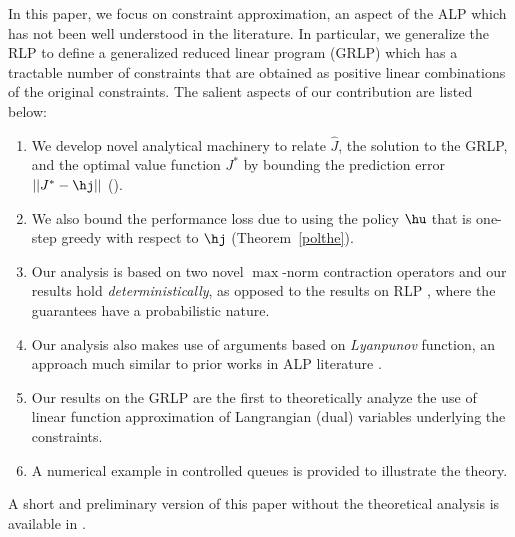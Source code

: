 In this paper, we focus on constraint approximation, an aspect of the ALP which has not been well understood in the literature. In particular, we generalize the RLP to define a generalized reduced linear program (GRLP) which has a tractable number of constraints that are obtained as positive linear combinations of the original constraints.
The salient aspects of our contribution are listed below:
\begin{enumerate}
		\item We develop novel analytical machinery to relate $\hat{J}$, the solution to the GRLP, and the optimal value function $J^*$ by bounding the prediction error $||J^*-\hj||$ (). 
		\item We also bound the performance loss due to using the policy $\hu$ that is one-step greedy with respect to $\hj$ (Theorem~\ref{polthe}).
		\item Our analysis is based on two novel $\max$-norm contraction operators and our results hold \emph{deterministically}, as opposed to the results on RLP \cite{SALP,CS}, where the guarantees have a probabilistic nature.
\item Our analysis also makes use of arguments based on \emph{Lyanpunov} function, an approach much similar to prior works in ALP literature \cite{ALP,SALP}.
		\item Our results on the GRLP are the first to theoretically analyze the use of linear function approximation of Langrangian (dual) variables underlying the constraints.
		\item A numerical example in controlled queues is provided to illustrate the theory.
\end{enumerate}
A short and preliminary version of this paper without the theoretical analysis is available in \cite{aaaipaper}.
